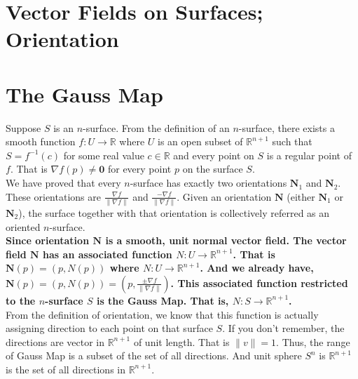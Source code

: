 \section{Vector Fields on Surfaces; Orientation}

\section{The Gauss Map}
	Suppose $S$ is an $n$-surface. From the definition of an $n$-surface, there exists a smooth function $f : U \to \mathbb{R}$ where $U$ is an open subset of $\mathbb{R}^{n+1}$ such that $S = f^{-1}(c)$ for some real value $c \in \mathbb{R}$ and every point on $S$ is a regular point of $f$. That is $\nabla f(p) \ne \mathbf{0}$ for every point $p$ on the surface $S$.\\

	We have proved that every $n$-surface has exactly two orientations $\mathbf{N}_1$ and $\mathbf{N}_2$. These orientations are $\frac{\nabla f}{\| \nabla f\|}$ and $\frac{-\nabla f}{\| \nabla f\|}$. Given an orientation $\mathbf{N}$ (either $\mathbf{N}_1$ or $\mathbf{N}_2$), the surface together with that orientation is collectively referred as an oriented $n$-surface.\\

	\textbf{Since orientation $\mathbf{N}$ is a smooth, unit normal vector field. The vector field $\mathbf{N}$ has an associated function $N : U \to \mathbb{R}^{n+1}$. That is $\mathbf{N}(p) = (p,N(p))$ where $N : U \to \mathbb{R}^{n+1}$. And we already have, $\mathbf{N}(p) = (p,N(p)) = (p, \frac{\pm \nabla f}{\| \nabla f\|})$. This associated function restricted to the $n$-surface $S$ is the \textbf{Gauss Map}. That is, $N : S \to \mathbb{R}^{n+1}$.}\\

	From the definition of orientation, we know that this function is actually assigning direction to each point on that surface $S$. If you don't remember, the directions are vector in $\mathbb{R}^{n+1}$ of unit length. That is $\|v\| = 1$. Thus, the range of Gauss Map is a subset of the set of all directions. And unit sphere $S^n$ is $\mathbb{R}^{n+1}$ is the set of all directions in $\mathbb{R}^{n+1}$.\\

